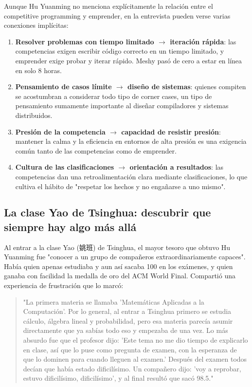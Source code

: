 \documentclass[a4paper]{article}
\begin{document}
Aunque Hu Yuanming no menciona explícitamente la relación entre el competitive programming y emprender, en la entrevista pueden verse varias conexiones implícitas:

\begin{enumerate}
\item \textbf{Resolver problemas con tiempo limitado $\rightarrow$ iteración rápida}: las competencias exigen escribir código correcto en un tiempo limitado, y emprender exige probar y iterar rápido. Meshy pasó de cero a estar en línea en solo 8 horas.
\item \textbf{Pensamiento de casos límite $\rightarrow$ diseño de sistemas}: quienes compiten se acostumbran a considerar todo tipo de corner cases, un tipo de pensamiento sumamente importante al diseñar compiladores y sistemas distribuidos.
\item \textbf{Presión de la competencia $\rightarrow$ capacidad de resistir presión}: mantener la calma y la eficiencia en entornos de alta presión es una exigencia común tanto de las competencias como de emprender.
\item \textbf{Cultura de las clasificaciones $\rightarrow$ orientación a resultados}: las competencias dan una retroalimentación clara mediante clasificaciones, lo que cultiva el hábito de "respetar los hechos y no engañarse a uno mismo".
\end{enumerate}

\subsection{La clase Yao de Tsinghua: descubrir que siempre hay algo más allá}

Al entrar a la clase Yao (姚班) de Tsinghua, el mayor tesoro que obtuvo Hu Yuanming fue "conocer a un grupo de compañeros extraordinariamente capaces". Había quien apenas estudiaba y aun así sacaba 100 en los exámenes, y quien ganaba con facilidad la medalla de oro del ACM World Final. Compartió una experiencia de frustración que lo marcó:

\begin{quote}
"La primera materia se llamaba 'Matemáticas Aplicadas a la Computación'. Por lo general, al entrar a Tsinghua primero se estudia cálculo, álgebra lineal y probabilidad, pero esa materia parecía asumir directamente que ya sabías todo eso y empezaba de una vez. Lo más absurdo fue que el profesor dijo: 'Este tema no me dio tiempo de explicarlo en clase, así que lo puse como pregunta de examen, con la esperanza de que lo dominen para cuando lleguen al examen.' Después del examen todos decían que había estado dificilísimo. Un compañero dijo: 'voy a reprobar, estuvo dificilísimo, dificilísimo', y al final resultó que sacó 98.5."
\end{quote}
\end{document}
